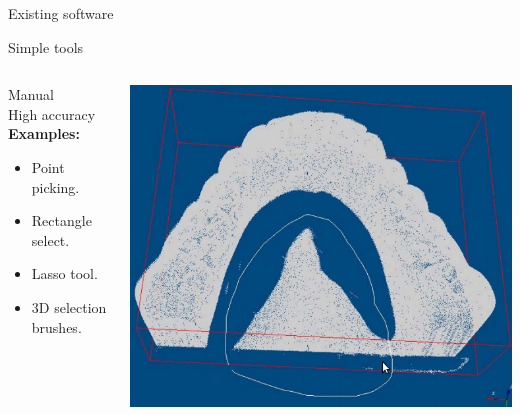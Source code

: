 \documentclass{beamer}
\begin{document}
\begin{frame}{Existing software}

\end{frame}


\begin{frame}{Simple tools}

\begin{columns}[T]
\begin{column}{0.5\textwidth}
Manual\\
High accuracy\\
\textbf{Examples:}
\begin{itemize}
\item Point picking.
\item Rectangle select.
\item Lasso tool.
\item 3D selection brushes.
\end{itemize}

\end{column}
\begin{column}{0.5\textwidth}
\includegraphics[width=1\textwidth]{pics/lasso.png}
\end{column}

\end{columns}

\end{frame}
\end{document}
